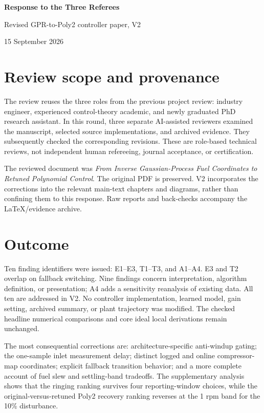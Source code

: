 \documentclass[11pt,a4paper]{article}
\begin{document}
\begin{center}
{\LARGE\sffamily\bfseries\color{navy} Response to the Three Referees}\par\vspace{5mm}
{\large Revised GPR-to-Poly2 controller paper, V2}\par
15 September 2026
\end{center}
\section*{Review scope and provenance}
The review reuses the three roles from the previous project review: industry engineer, experienced control-theory academic, and newly graduated PhD research assistant. In this round, three separate AI-assisted reviewers examined the manuscript, selected source implementations, and archived evidence. They subsequently checked the corresponding revisions. These are role-based technical reviews, not independent human refereeing, journal acceptance, or certification.

The reviewed document was \emph{From Inverse Gaussian-Process Fuel Coordinates to Retuned Polynomial Control}. The original PDF is preserved. V2 incorporates the corrections into the relevant main-text chapters and diagrams, rather than confining them to this response. Raw reports and back-checks accompany the LaTeX/evidence archive.

\section*{Outcome}
Ten finding identifiers were issued: E1--E3, T1--T3, and A1--A4. E3 and T2 overlap on fallback switching. Nine findings concern interpretation, algorithm definition, or presentation; A4 adds a sensitivity reanalysis of existing data. All ten are addressed in V2. No controller implementation, learned model, gain setting, archived summary, or plant trajectory was modified. The checked headline numerical comparisons and core ideal local derivations remain unchanged.

The most consequential corrections are: architecture-specific anti-windup gating; the one-sample inlet measurement delay; distinct logged and online compressor-map coordinates; explicit fallback transition behavior; and a more complete account of fuel slew and settling-band tradeoffs. The supplementary analysis shows that the ringing ranking survives four reporting-window choices, while the original-versus-retuned Poly2 recovery ranking reverses at the 1 rpm band for the 10\% disturbance.
\end{document}

